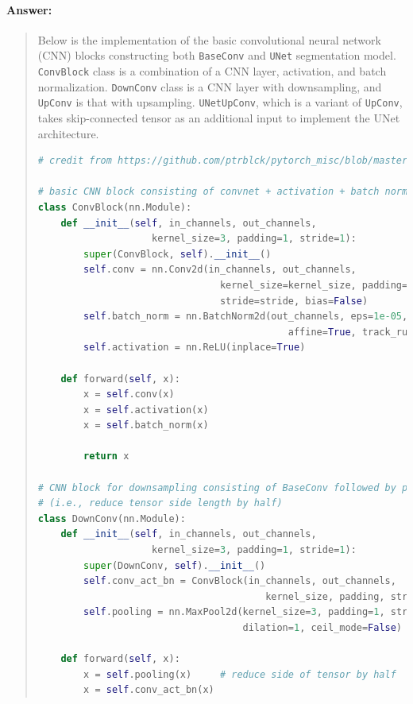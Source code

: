 \documentclass[9pt]{article}
\begin{document}
\paragraph{Answer:} 
\begin{quote} 

Below is the implementation of the basic convolutional neural network (CNN) blocks constructing both \texttt{BaseConv} and \texttt{UNet} segmentation model. \texttt{ConvBlock} class is a combination of a CNN layer, activation, and batch normalization. \texttt{DownConv} class is a CNN layer with downsampling, and \texttt{UpConv} is that with upsampling. \texttt{UNetUpConv}, which is a variant of \texttt{UpConv}, takes skip-connected tensor as an additional input to implement the UNet architecture.

\begin{lstlisting}[language=Python, basicstyle=\scriptsize]
# credit from https://github.com/ptrblck/pytorch_misc/blob/master/unet_demo.py

# basic CNN block consisting of convnet + activation + batch normalization
class ConvBlock(nn.Module):
    def __init__(self, in_channels, out_channels, 
                    kernel_size=3, padding=1, stride=1):
        super(ConvBlock, self).__init__()
        self.conv = nn.Conv2d(in_channels, out_channels, 
                                kernel_size=kernel_size, padding=padding, 
                                stride=stride, bias=False)
        self.batch_norm = nn.BatchNorm2d(out_channels, eps=1e-05, momentum=0.1, 
                                            affine=True, track_running_stats=True)
        self.activation = nn.ReLU(inplace=True)
    
    def forward(self, x):
        x = self.conv(x)
        x = self.activation(x)
        x = self.batch_norm(x)
    
        return x

# CNN block for downsampling consisting of BaseConv followed by pooling 
# (i.e., reduce tensor side length by half)
class DownConv(nn.Module):
    def __init__(self, in_channels, out_channels, 
                    kernel_size=3, padding=1, stride=1):
        super(DownConv, self).__init__()
        self.conv_act_bn = ConvBlock(in_channels, out_channels, 
                                        kernel_size, padding, stride)
        self.pooling = nn.MaxPool2d(kernel_size=3, padding=1, stride=2, 
                                    dilation=1, ceil_mode=False)
        
    def forward(self, x):
        x = self.pooling(x)     # reduce side of tensor by half
        x = self.conv_act_bn(x)   


\end{lstlisting}
\end{quote}
\end{document}

